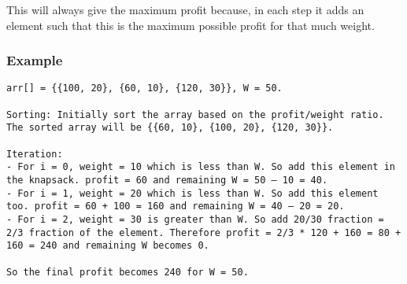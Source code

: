 \documentclass[11pt]{article}
\begin{document}
This will always give the maximum profit because, in each step it adds an element such that this is the maximum possible profit for that much weight.

\subsubsection{Example}
\label{sec:orgc5cc5d9}
\begin{verbatim}
arr[] = {{100, 20}, {60, 10}, {120, 30}}, W = 50.

Sorting: Initially sort the array based on the profit/weight ratio. The sorted array will be {{60, 10}, {100, 20}, {120, 30}}.

Iteration:
- For i = 0, weight = 10 which is less than W. So add this element in the knapsack. profit = 60 and remaining W = 50 – 10 = 40.
- For i = 1, weight = 20 which is less than W. So add this element too. profit = 60 + 100 = 160 and remaining W = 40 – 20 = 20.
- For i = 2, weight = 30 is greater than W. So add 20/30 fraction = 2/3 fraction of the element. Therefore profit = 2/3 * 120 + 160 = 80 + 160 = 240 and remaining W becomes 0.

So the final profit becomes 240 for W = 50.
\end{verbatim}
\end{document}
